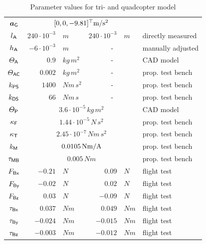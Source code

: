 \begin{table}
\begin{tabular}{crlrll}
  \\[1ex]
  $\boldsymbol{a}_{\mathsf{G}}$ & \multicolumn{4}{c}{$[0, 0, -9.81]^\top \text{m} / \text{s}^2$} & 
  \\[1ex]
  $l_{\mathsf{A}}$ & $ 240 \cdot 10^{-3}$&$\unit{m}$ & $240 \cdot 10^{-3}$&$\unit{m}$ & directly measured \\
  $h_{\mathsf{A}}$ & $  -6 \cdot 10^{-3}$&$\unit{m}$ & \multicolumn{2}{c}{-} & manually adjusted
  \\[1ex]
  $\varTheta_{\mathsf{A}}$  & $ 0.9$&$\unit{kg}\,\unit{m}^2$ & \multicolumn{2}{c}{-} & CAD model \\
  $\varTheta_{\mathsf{AC}}$ & $ 0.002$&$\unit{kg}\,\unit{m}^2$ & \multicolumn{2}{c}{-} & prop. test bench \\
  $k_{\mathsf{PS}}$ & $ 1400 $&$\unit{Nm}\,\unit{s}^2$ & \multicolumn{2}{c}{-} & prop. test bench\\
  $k_{\mathsf{DS}}$ & $ 66$&$\unit{Nm}\,\unit{s}$ & \multicolumn{2}{c}{-} & prop. test bench
  \\[1ex] 
  $\varTheta_{\mathsf{P}}$  & \multicolumn{4}{c}{$3.6 \cdot 10^{-5}\,\unit{kg}\,\unit{m}^2$} & CAD model \\
  $\kappa_{\mathsf{F}}$ & \multicolumn{4}{c}{$1.44 \cdot 10^{-5}\,\unit{N}\,\unit{s}^2$} & prop. test bench \\
  $\kappa_{\mathsf{T}}$ & \multicolumn{4}{c}{$2.45 \cdot 10^{-7}\,\unit{N}\unit{m}\,\unit{s}^2$} & prop. test bench \\
  $k_{\mathsf{M}}$ & \multicolumn{4}{c}{$0.0105\,\text{N}\text{m} / \text{A}$} & prop. test bench \\
  $\tau_{\mathsf{MB}}$ & \multicolumn{4}{c}{$0.005\,\unit{N}\unit{m}$} & prop. test bench
  \\[1ex]
  $F_{\mathsf{Bx}}$ & $-0.21$&$\unit{N}$ & $ 0.09$&$\unit{N}$ & flight test \\
  $F_{\mathsf{By}}$ & $-0.02$&$\unit{N}$ & $ 0.02$&$\unit{N}$ & flight test \\
  $F_{\mathsf{Bz}}$ & $ 0.03$&$\unit{N}$ & $ -0.09$&$\unit{N}$ & flight test \\
  $\tau_{\mathsf{Bx}}$ & $ 0.037$&$\unit{N}\unit{m}$ & $ 0.049$&$\unit{N}\unit{m}$ & flight test \\
  $\tau_{\mathsf{By}}$ & $-0.024$&$\unit{N}\unit{m}$ & $-0.015$&$\unit{N}\unit{m}$ & flight test \\
  $\tau_{\mathsf{Bz}}$ & $-0.003$&$\unit{N}\unit{m}$ & $-0.012$&$\unit{N}\unit{m}$ & flight test \\
  \bottomrule
 \end{tabular}
 \caption{Parameter values for tri- and quadcopter model}
 \label{tab:ParamTriQuad}
\end{table}

